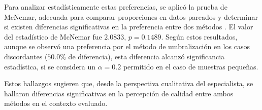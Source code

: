 Para analizar estadísticamente estas preferencias, se aplicó la prueba de McNemar, adecuada para comparar proporciones en datos pareados y determinar si existen diferencias significativas en la preferencia entre dos métodos \cite{mcnemar}. El valor del estadístico de McNemar fue $2.0833$, $p = 0.1489$. Según estos resultados, aunque se observó una preferencia por el método de umbralización en los casos discordantes ($50.0\%$ de diferencia), esta diferencia alcanzó significancia estadística, si se considera un $\alpha = 0.2$ permitido en el caso de muestras pequeñas.

Estos hallazgos sugieren que, desde la perspectiva cualitativa del especialista, se hallaron diferencias significativas en la percepción de calidad entre ambos métodos en el contexto evaluado.